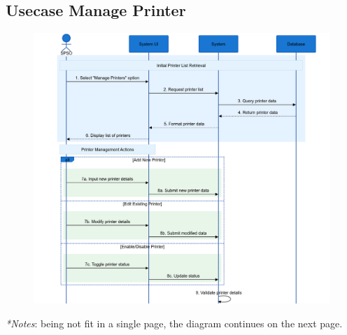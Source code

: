 \documentclass[a4paper]{report}
\begin{document}

\subsection{Usecase Manage Printer}

\begin{figure}[H]
    \centering
    \includegraphics[width=\textwidth ]{images/sequence_diagram/Manage Printers_1.png}
    \label{fig:manage_printer}
\end{figure}

\small \textit{*Notes}: being not fit in a single page, the diagram continues on the next page.

\normalsize
\end{document}
